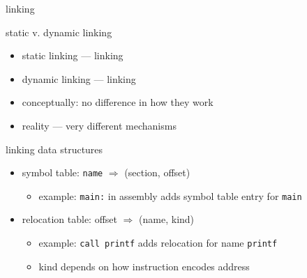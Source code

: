 
\begin{frame}{linking}
\end{frame}

\begin{frame}{static v. dynamic linking}
    \begin{itemize}
    \item static linking --- linking 
    \item dynamic linking --- linking 
    \vspace{.5cm}
    \item<2> conceptually: no difference in how they work
    \item<2> reality --- very different mechanisms
    \end{itemize}
\end{frame}

\begin{frame}{linking data structures}
    \begin{itemize}
    \item symbol table: {\tt name} $\Rightarrow$ (section, offset)
        \begin{itemize}
        \item example: {\tt main:} in assembly adds symbol table entry for {\tt main}
        \end{itemize}
    \item relocation table: offset $\Rightarrow$ (name, kind)
        \begin{itemize}
        \item example: {\tt call printf} adds relocation for name {\tt printf}
        \item kind depends on how instruction encodes address
        \end{itemize}
    \end{itemize}
\end{frame}

